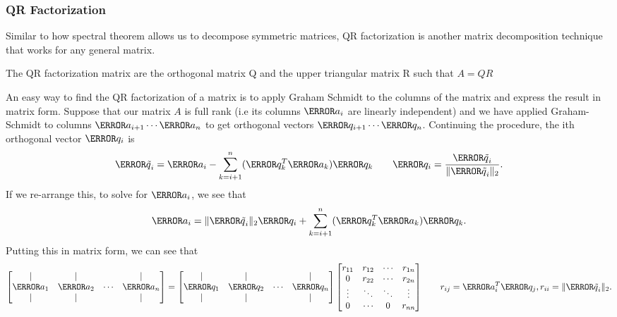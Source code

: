\subsubsection{QR Factorization}
Similar to how spectral theorem allows us to decompose symmetric matrices, QR factorization is another matrix decomposition technique that works for any general matrix.
\begin{definition}
  The QR factorization matrix are the orthogonal matrix Q and the upper triangular matrix R such that $A = QR$
  \label{defn:qr-factorization}
\end{definition}
An easy way to find the QR factorization of a matrix is to apply Graham Schmidt to the columns of the matrix and express the result in matrix form.
Suppose that our matrix $A$ is full rank (i.e its columns $\V{a}_i$ are linearly independent) and we have applied Graham-Schmidt to columns $\V{a}_{i+1}\cdots\V{a}_n$ to get orthogonal vectors $\V{q}_{i+1}\cdots\V{q}_{n}$.
Continuing the procedure, the ith orthogonal vector $\V{q}_i$ is
\[
  \V{\tilde{q}}_i = \V{a}_i - \sum_{k=i+1}^{n} (\V{q}_k^T \V{a}_k)\V{q}_k \qquad \V{q}_i = \frac{\V{\tilde{q}}_i}{\|\V{\tilde{q}}_i\|_2}.
\]
If we re-arrange this, to solve for $\V{a}_i$, we see that
\[
  \V{a}_i = \|\V{\tilde{q}}_i\|_2 \V{q}_i + \sum_{k=i+1}^{n} (\V{q}_k^T \V{a}_k)\V{q}_k.
\]
Putting this in matrix form, we can see that
\[
  \begin{bmatrix}
	| & | & & | \\
	\V{a}_1 & \V{a}_2 & \cdots & \V{a}_{n}\\
	| & | & & | \\
  \end{bmatrix} = \begin{bmatrix}
	| & | & & | \\
	\V{q}_1 & \V{q}_2 & \cdots & \V{q}_{n}\\
	| & | & & | \\
  \end{bmatrix} \begin{bmatrix}
	r_{11} & r_{12} & \cdots & r_{1n}\\
	0 & r_{22} & \cdots & r_{2n}\\
	\vdots & \ddots & \ddots & \vdots\\
	0 & \cdots & 0 & r_{nn}
  \end{bmatrix} \qquad r_{ij} = \V{a}_i^T\V{q_j}, r_{ii} = \|\V{\tilde{q}}_i\|_2.
\]

